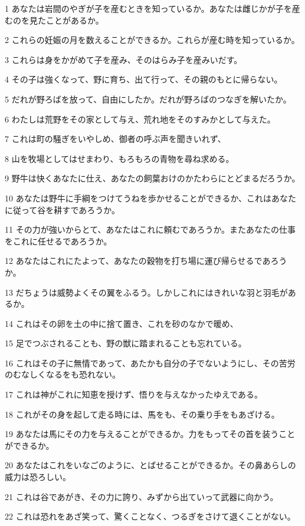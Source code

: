 \par 1 あなたは岩間のやぎが子を産むときを知っているか。あなたは雌じかが子を産むのを見たことがあるか。
\par 2 これらの妊娠の月を数えることができるか。これらが産む時を知っているか。
\par 3 これらは身をかがめて子を産み、そのはらみ子を産みいだす。
\par 4 その子は強くなって、野に育ち、出て行って、その親のもとに帰らない。
\par 5 だれが野ろばを放って、自由にしたか。だれが野ろばのつなぎを解いたか。
\par 6 わたしは荒野をその家として与え、荒れ地をそのすみかとして与えた。
\par 7 これは町の騒ぎをいやしめ、御者の呼ぶ声を聞きいれず、
\par 8 山を牧場としてはせまわり、もろもろの青物を尋ね求める。
\par 9 野牛は快くあなたに仕え、あなたの飼葉おけのかたわらにとどまるだろうか。
\par 10 あなたは野牛に手綱をつけてうねを歩かせることができるか、これはあなたに従って谷を耕すであろうか。
\par 11 その力が強いからとて、あなたはこれに頼むであろうか。またあなたの仕事をこれに任せるであろうか。
\par 12 あなたはこれにたよって、あなたの穀物を打ち場に運び帰らせるであろうか。
\par 13 だちょうは威勢よくその翼をふるう。しかしこれにはきれいな羽と羽毛があるか。
\par 14 これはその卵を土の中に捨て置き、これを砂のなかで暖め、
\par 15 足でつぶされることも、野の獣に踏まれることも忘れている。
\par 16 これはその子に無情であって、あたかも自分の子でないようにし、その苦労のむなしくなるをも恐れない。
\par 17 これは神がこれに知恵を授けず、悟りを与えなかったゆえである。
\par 18 これがその身を起して走る時には、馬をも、その乗り手をもあざける。
\par 19 あなたは馬にその力を与えることができるか。力をもってその首を装うことができるか。
\par 20 あなたはこれをいなごのように、とばせることができるか。その鼻あらしの威力は恐ろしい。
\par 21 これは谷であがき、その力に誇り、みずから出ていって武器に向かう。
\par 22 これは恐れをあざ笑って、驚くことなく、つるぎをさけて退くことがない。
